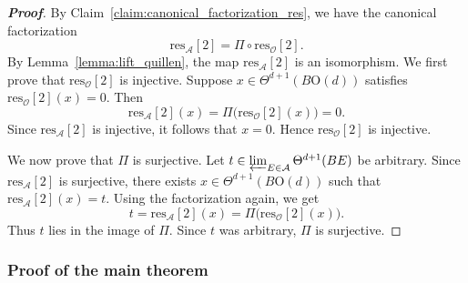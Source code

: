 \documentclass[aps,prx,reprint,superscriptaddress,twocolumn,amsmath,amssymb,amsfonts, nofootinbib]{revtex4-2}
\newcommand{\res}{\text{res}}
\theoremstyle{apsstyle}
\begin{document}
\begin{proof}[\textnormal{\textbf{Proof}}]
By Claim~\ref{claim:canonical_factorization_res}, we have the canonical factorization
\begin{equation}
\res_{\mathcal A}[2] = \Pi\circ \res_{\mathcal O}[2].
\end{equation}
By Lemma~\ref{lemma:lift_quillen}, the map $\res_{\mathcal A}[2]$ is an isomorphism. We first prove that $\res_{\mathcal O}[2]$ is injective. Suppose $x\in \Theta^{d+1}(B\mathrm{O}(d))$ satisfies $\res_{\mathcal O}[2](x)=0$. Then
\begin{equation}
\res_{\mathcal A}[2](x) = \Pi\bigl(\res_{\mathcal O}[2](x)\bigr) = 0.
\end{equation}
Since $\res_{\mathcal A}[2]$ is injective, it follows that $x=0$. Hence $\res_{\mathcal O}[2]$ is injective.

\noindent We now prove that $\Pi$ is surjective. Let
$t\in \varprojlim_{E\in\mathcal A}\Theta^{d+1}(BE)$
be arbitrary. Since $\res_{\mathcal A}[2]$ is surjective, there exists $x\in \Theta^{d+1}(B\mathrm{O}(d))$ such that $\res_{\mathcal A}[2](x)=t$. Using the factorization again, we get
\begin{equation}
t = \res_{\mathcal A}[2](x) = \Pi\bigl(\res_{\mathcal O}[2](x)\bigr).
\end{equation}
Thus $t$ lies in the image of $\Pi$. Since $t$ was arbitrary, $\Pi$ is surjective.
\end{proof}

\subsubsection{Proof of the main theorem}
\label{app:main_theorem_proof}
\end{document}
